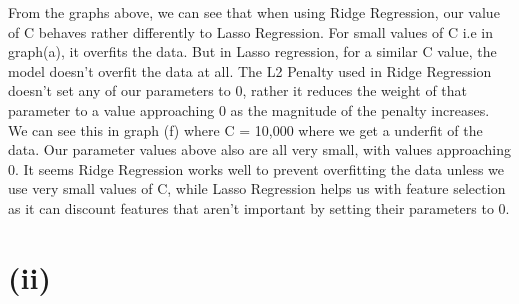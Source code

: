 \documentclass[11pt]{article} %
\begin{document}
\begin{figure}[h]
\qquad
{}
\qquad
{}
\end{figure}
From the graphs above, we can see that when using Ridge Regression, our value of C behaves rather differently to Lasso Regression. For small values of C i.e in graph(a), it overfits the data. But in Lasso regression, for a similar C value, the model doesn't overfit the data at all. The L2 Penalty used in Ridge Regression doesn't set any of our parameters to 0, rather it reduces the weight of that parameter to a value approaching 0 as the magnitude of the penalty increases. We can see this in graph (f) where C = 10,000 where we get a underfit of the data. Our parameter values above also are all very small, with values approaching 0. It seems Ridge Regression works well to prevent overfitting the data unless we use very small values of C, while Lasso Regression helps us with feature selection as it can discount features that aren't important by setting their parameters to 0.
\newpage
\section{(ii)} 
\end{document}
